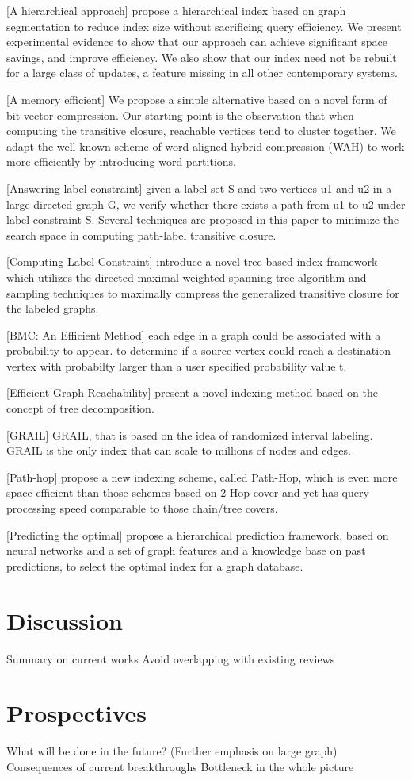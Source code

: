 \documentclass[12pt, conference, compsocconf]{../IEEEtran}
\begin{document}
[A hierarchical approach] propose a hierarchical index based on graph segmentation to reduce index size without sacrificing query efficiency. We present experimental evidence to show that our approach can achieve significant space savings, and improve efficiency. We also show that our index need not be rebuilt for a large class of updates, a feature missing in all other contemporary systems.

[A memory efficient] We propose a simple alternative based on a novel form of bit-vector compression. Our starting point is the observation that when computing the transitive closure, reachable vertices tend to cluster together. We adapt the well-known scheme of word-aligned hybrid compression (WAH) to work more efficiently by introducing word partitions. 

[Answering label-constraint] given a label set S and two vertices u1 and u2 in a large directed graph G, we verify whether there exists a path from u1 to u2 under label constraint S. Several techniques are proposed in this paper to minimize the search space in computing path-label transitive closure.

[Computing Label-Constraint] introduce a novel tree-based index framework which utilizes the directed maximal weighted spanning tree algorithm and sampling techniques to maximally compress the generalized transitive closure for the labeled graphs.

[BMC: An Efficient Method] each edge in a graph could be associated with a probability to appear. to determine if a source vertex could reach a destination vertex with probabilty larger than a user specified probability value t.

[Efficient Graph Reachability] present a novel indexing method based on the concept of tree decomposition. 

[GRAIL] GRAIL, that is based on the idea of randomized interval labeling. GRAIL is the only index that can scale to millions of nodes and edges.

[Path-hop] propose a new indexing scheme, called Path-Hop, which is even more space-efficient than those schemes based on 2-Hop cover and yet has query processing speed comparable to those chain/tree covers. 

[Predicting the optimal] propose a hierarchical prediction framework, based on neural networks and a set of graph features and a knowledge base on past predictions, to select the optimal index for a graph database.

\section{Discussion}

Summary on current works
  Avoid overlapping with existing reviews

\section{Prospectives}

What will be done in the future? (Further emphasis on large graph)
  Consequences of current breakthroughs
  Bottleneck in the whole picture



\end{document}
